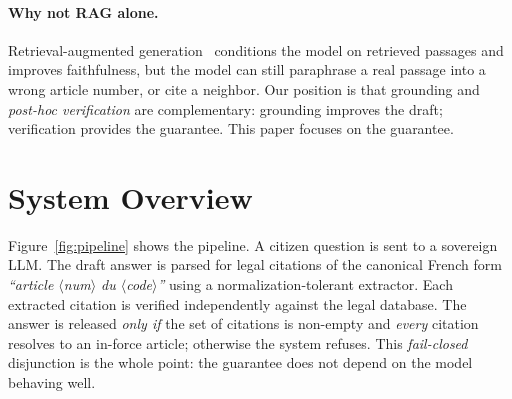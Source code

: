 \documentclass[sigconf, nonacm]{acmart}
\begin{document}
\paragraph{Why not RAG alone.}
Retrieval-augmented generation~\cite{lewis2020rag} conditions the model on
retrieved passages and improves faithfulness, but the model can still
paraphrase a real passage into a wrong article number, or cite a neighbor.
Our position is that grounding and \emph{post-hoc verification} are
complementary: grounding improves the draft; verification provides the
guarantee. This paper focuses on the guarantee.

\section{System Overview}
\label{sec:overview}

Figure~\ref{fig:pipeline} shows the pipeline. A citizen question is sent to a
sovereign LLM. The draft answer is parsed for legal citations of the canonical
French form \emph{``article $\langle$num$\rangle$ du $\langle$code$\rangle$''}
using a normalization-tolerant extractor. Each extracted citation is verified
independently against the legal database. The answer is released
\emph{only if} the set of citations is non-empty and \emph{every} citation
resolves to an in-force article; otherwise the system refuses. This
\emph{fail-closed} disjunction is the whole point: the guarantee does not
depend on the model behaving well.
\end{document}
